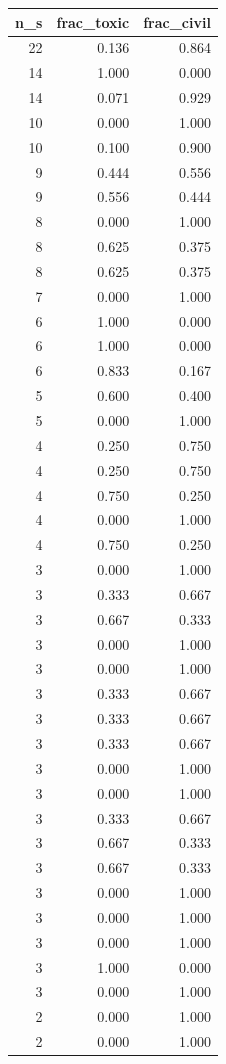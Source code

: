 \begin{tabular}{rrr}
\toprule
n_s & frac_toxic & frac_civil \\
\midrule
22 & 0.136 & 0.864 \\
14 & 1.000 & 0.000 \\
14 & 0.071 & 0.929 \\
10 & 0.000 & 1.000 \\
10 & 0.100 & 0.900 \\
9 & 0.444 & 0.556 \\
9 & 0.556 & 0.444 \\
8 & 0.000 & 1.000 \\
8 & 0.625 & 0.375 \\
8 & 0.625 & 0.375 \\
7 & 0.000 & 1.000 \\
6 & 1.000 & 0.000 \\
6 & 1.000 & 0.000 \\
6 & 0.833 & 0.167 \\
5 & 0.600 & 0.400 \\
5 & 0.000 & 1.000 \\
4 & 0.250 & 0.750 \\
4 & 0.250 & 0.750 \\
4 & 0.750 & 0.250 \\
4 & 0.000 & 1.000 \\
4 & 0.750 & 0.250 \\
3 & 0.000 & 1.000 \\
3 & 0.333 & 0.667 \\
3 & 0.667 & 0.333 \\
3 & 0.000 & 1.000 \\
3 & 0.000 & 1.000 \\
3 & 0.333 & 0.667 \\
3 & 0.333 & 0.667 \\
3 & 0.333 & 0.667 \\
3 & 0.000 & 1.000 \\
3 & 0.000 & 1.000 \\
3 & 0.333 & 0.667 \\
3 & 0.667 & 0.333 \\
3 & 0.667 & 0.333 \\
3 & 0.000 & 1.000 \\
3 & 0.000 & 1.000 \\
3 & 0.000 & 1.000 \\
3 & 1.000 & 0.000 \\
3 & 0.000 & 1.000 \\
2 & 0.000 & 1.000 \\
2 & 0.000 & 1.000 \\

\end{tabular}
